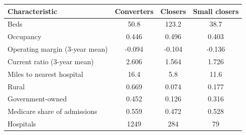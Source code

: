 \begin{tabular}{lccc}
\toprule
Characteristic & Converters & Closers & Small closers \\
\midrule
Beds & 50.8 & 123.2 & 38.7 \\
Occupancy & 0.446 & 0.496 & 0.403 \\
Operating margin (3-year mean) & -0.094 & -0.104 & -0.136 \\
Current ratio (3-year mean) & 2.606 & 1.564 & 1.726 \\
Miles to nearest hospital & 16.4 & 5.8 & 11.6 \\
Rural & 0.669 & 0.074 & 0.177 \\
Government-owned & 0.452 & 0.126 & 0.316 \\
Medicare share of admissions & 0.559 & 0.472 & 0.528 \\
\addlinespace
Hospitals & 1249 & 284 & 79 \\
\bottomrule
\end{tabular}
